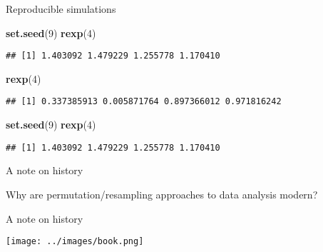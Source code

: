 \documentclass[ignorenonframetext,]{beamer}
\newenvironment{Shaded}{\begin{snugshade}}{\end{snugshade}}
\newcommand{\DecValTok}[1]{\textcolor[rgb]{0.00,0.00,0.81}{#1}}
\newcommand{\KeywordTok}[1]{\textcolor[rgb]{0.13,0.29,0.53}{\textbf{#1}}}
\newcommand{\NormalTok}[1]{#1}
\begin{document}
\begin{frame}[fragile]{Reproducible simulations}
\protect\hypertarget{reproducible-simulations}{}

\begin{Shaded}
\begin{Highlighting}[]
\KeywordTok{set.seed}\NormalTok{(}\DecValTok{9}\NormalTok{)}
\KeywordTok{rexp}\NormalTok{(}\DecValTok{4}\NormalTok{)}
\end{Highlighting}
\end{Shaded}

\begin{verbatim}
## [1] 1.403092 1.479229 1.255778 1.170410
\end{verbatim}

\begin{Shaded}
\begin{Highlighting}[]
\KeywordTok{rexp}\NormalTok{(}\DecValTok{4}\NormalTok{)}
\end{Highlighting}
\end{Shaded}

\begin{verbatim}
## [1] 0.337385913 0.005871764 0.897366012 0.971816242
\end{verbatim}

\begin{Shaded}
\begin{Highlighting}[]
\KeywordTok{set.seed}\NormalTok{(}\DecValTok{9}\NormalTok{)}
\KeywordTok{rexp}\NormalTok{(}\DecValTok{4}\NormalTok{)}
\end{Highlighting}
\end{Shaded}

\begin{verbatim}
## [1] 1.403092 1.479229 1.255778 1.170410
\end{verbatim}

\end{frame}

\begin{frame}{A note on history}
\protect\hypertarget{a-note-on-history}{}

Why are permutation/resampling approaches to data analysis modern?

\end{frame}

\begin{frame}{A note on history}
\protect\hypertarget{a-note-on-history-1}{}

\texttt{[image: ../images/book.png]}

\end{frame}
\end{document}
